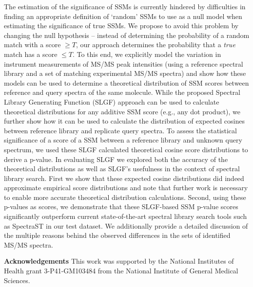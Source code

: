 \documentclass[llncs]{article}
\begin{document}
The estimation of the significance of SSMs is currently hindered by difficulties in finding an appropriate definition of `random' SSMs to use as a null model when estimating the significance of true SSMs. 
We propose to avoid this problem by changing the null hypothesis -- instead of determining the probability of a random match with a score $\ge T$, our approach determines the probability that a \emph{true} match has a score $\le T$. 
To this end, we explicitly model the variation in instrument measurements of MS/MS peak intensities (using a reference spectral library and a set of matching experimental MS/MS spectra) and show how these models can be used to determine a theoretical distribution of SSM scores between reference and query spectra of the same molecule. While the proposed Spectral Library Generating Function (SLGF) approach can be used to calculate theoretical distributions for any additive SSM score (e.g., any dot product), we further show how it can be used to calculate the distribution of expected cosines between reference library and replicate query spectra. 
To assess the statistical significance of a score of a SSM between a reference library and unknown query spectrum, we used these SLGF calculated theoretical cosine score distributions to derive a p-value. 
In evaluating SLGF we explored both the accuracy of the theoretical distributions as well as SLGF's usefulness in the context of spectral library search. First we show that these expected cosine distributions did indeed approximate empirical score distributions and note that further work is necessary to enable more accurate theoretical distribution calculations. 
Second, using these p-values as scores, we demonstrate that these SLGF-based SSM p-value scores significantly outperform current state-of-the-art spectral library search tools such as SpectraST \cite{lam07} in our test dataset. We additionally provide a detailed discussion of the multiple reasons behind the observed differences in the sets of identified MS/MS spectra.


{\bf Acknowledgements}
This work was supported by the National Institutes of Health grant 3-P41-GM103484 from the National Institute of General Medical Sciences.


	

\end{document}
